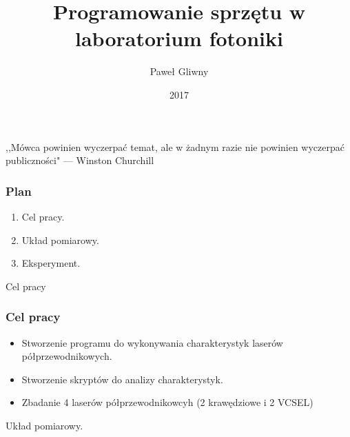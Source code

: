 \documentclass[xcolor={dvipsnames,table}]{beamer}
\title{Programowanie sprzętu w laboratorium fotoniki}
\author{Paweł Gliwny}
\institute{Instytut Fizyki \\ Politechnika Łódzka}
\date{2017}
\begin{document}
\frame{\titlepage}

\begin{frame}
\begin{Large}
\begin{center}
,,Mówca powinien wyczerpać temat, ale w żadnym razie nie powinien wyczerpać publiczności" --- Winston Churchill
\end{center}
\end{Large}
\end{frame}

\begin{frame}
\frametitle{Plan}
\begin{enumerate}
\item Cel pracy.
\item Układ pomiarowy.
\item Eksperyment.
\end{enumerate}
\end{frame}

\begin{frame}
\begin{Huge}
\begin{center}
Cel pracy
\end{center}
\end{Huge}
\end{frame}

\begin{frame}
\frametitle{Cel pracy}
\begin{itemize}
\item Stworzenie programu do wykonywania charakterystyk laserów półprzewodnikowych.
\item Stworzenie skryptów do analizy charakterystyk.
\item Zbadanie 4 laserów półprzewodnikowcyh (2 krawędziowe i 2 VCSEL)
\end{itemize}
\end{frame}

\begin{frame}
\begin{Huge}
\begin{center}
Układ pomiarowy.
\end{center}
\end{Huge}
\end{frame}
\end{document}
